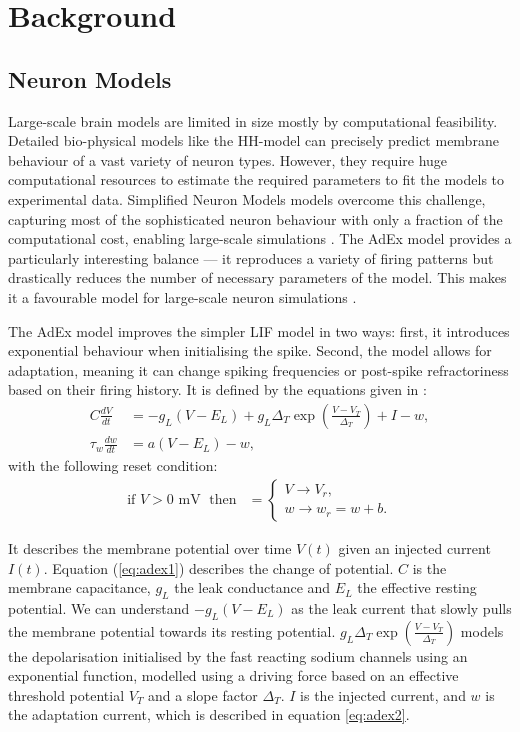 \documentclass[conference]{IEEEtran}
\begin{document}
\section{Background}\label{sec:background}
\subsection{Neuron Models}
Large-scale brain models are limited in size mostly by computational feasibility.
Detailed bio-physical models like the \ac{HH}-model can precisely predict membrane behaviour of a vast variety of neuron types.
However, they require huge computational resources to estimate the required parameters to fit the models to experimental data.
Simplified Neuron Models models overcome this challenge, capturing most of the sophisticated neuron behaviour with only a fraction of the computational cost, enabling large-scale simulations \cite{Gerstner2014}.
The \acf{AdEx} model \cite{Naud2008} provides a particularly interesting balance --- it reproduces a variety of firing patterns but drastically reduces the number of necessary parameters of the model.
This makes it a favourable model for large-scale neuron simulations \cite{Tesler2024}.

The \ac{AdEx} model improves the simpler \ac{LIF} model in two ways:
first, it introduces exponential behaviour when initialising the spike.
Second, the model allows for adaptation, meaning it can change spiking frequencies or post-spike refractoriness based on their firing history.
It is defined by the equations given in \cite{Brette2005, Naud2008}:
\begin{align}
  C \frac{dV}{dt} &= -g_L (V - E_L) + g_L \Delta_T \exp(\frac{V - V_T}{\Delta_T}) + I - w,\label{eq:adex1}\\
  \tau_w \frac{dw}{dt} &= a(V - E_L) - w,\label{eq:adex2}
\end{align}
with the following reset condition:
\begin{align}
  \text{if } V > 0 \text{ mV}\; \text{ then} &= \begin{cases}
    V \rightarrow V_r,\\
    w \rightarrow w_r = w + b.
  \end{cases}\label{eq:adex3}
\end{align}

It describes the membrane potential over time $V(t)$ given an injected current $I(t)$.
Equation (\ref{eq:adex1}) describes the change of potential.
$C$ is the membrane capacitance, $g_L$ the leak conductance and $E_L$ the effective resting potential.
We can understand $-g_L (V - E_L)$ as the leak current that slowly pulls the membrane potential towards its resting potential.
$g_L \Delta_T \exp(\frac{V - V_T}{\Delta_T})$ models the depolarisation initialised by the fast reacting sodium channels using an exponential function,
modelled using a driving force based on an effective threshold potential $V_T$ and a slope factor $\Delta_T$.
$I$ is the injected current, and $w$ is the adaptation current, which is described in equation \ref{eq:adex2}.
\end{document}
